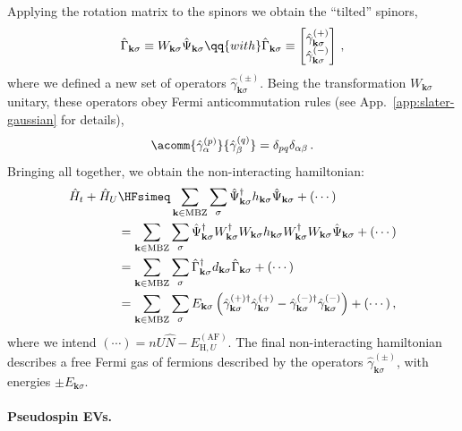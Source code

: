 Applying the rotation matrix to the spinors we obtain the ``tilted'' spinors,
\begin{equation}\label{eq:af-Gamma=WPsi}
	\hat\Gamma_{\mathbf{k}\sigma} \equiv W_{\mathbf{k}\sigma} \hat \Psi_{\mathbf{k}\sigma}
	\qq{with}
	\hat\Gamma_{\mathbf{k}\sigma} \equiv \begin{bmatrix}
		\hat \gamma_{\mathbf{k}\sigma}^{(+)} \\ \hat \gamma_{\mathbf{k}\sigma}^{(-)}
	\end{bmatrix} \, ,
\end{equation}
where we defined a new set of operators $\hat \gamma^{(\pm)}_{\mathbf{k}\sigma}$. Being the transformation $W_{\mathbf{k}\sigma}$ unitary, these operators obey Fermi anticommutation rules (see App.~\ref{app:slater-gaussian} for details),
\[
	\acomm{\hat \gamma_\alpha^{(p)}}{\hat \gamma_\beta^{(q)}} = \delta_{pq} \delta_{\alpha\beta} \, .
\]
Bringing all together, we obtain the non-interacting hamiltonian:
\begin{align}
	\hat H_t + \hat H_U &\HFsimeq \sum_{\mathbf{k} \in \mathrm{MBZ}} \sum_\sigma \hat \Psi_{\mathbf{k}\sigma}^\dagger h_{\mathbf{k}\sigma} \hat \Psi_{\mathbf{k}\sigma} + (\cdots) \nonumber \\
	&= \sum_{\mathbf{k} \in \mathrm{MBZ}} \sum_\sigma \hat \Psi_{\mathbf{k}\sigma}^\dagger W_{\mathbf{k}\sigma}^\dagger W_{\mathbf{k}\sigma} h_{\mathbf{k}\sigma} W_{\mathbf{k}\sigma}^\dagger W_{\mathbf{k}\sigma} \hat \Psi_{\mathbf{k}\sigma} + (\cdots) \nonumber \\
	&= \sum_{\mathbf{k} \in \mathrm{MBZ}} \sum_\sigma \hat \Gamma_{\mathbf{k}\sigma}^\dagger d_{\mathbf{k}\sigma} \hat \Gamma_{\mathbf{k}\sigma} + (\cdots) \nonumber \\
	&= \sum_{\mathbf{k} \in \mathrm{MBZ}} \sum_\sigma E_{\mathbf{k}\sigma} \left(
	\hat \gamma_{\mathbf{k}\sigma}^{(+)\dagger} \hat \gamma_{\mathbf{k}\sigma}^{(+)} - \hat \gamma_{\mathbf{k}\sigma}^{(-)\dagger} \hat \gamma_{\mathbf{k}\sigma}^{(-)}
	\right) + (\cdots) \label{eq:af-hm-bog} \, ,
\end{align}
where we intend $(\cdots) = nU \hat N -  E_{\mathrm{H},U}^{(\mathrm{AF})}$. The final non-interacting hamiltonian describes a free Fermi gas of fermions described by the operators $\hat \gamma^{(\pm)}_{\mathbf{k}\sigma}$, with energies $\pm E_{\mathbf{k}\sigma}$.

\paragraph{Pseudospin EVs.}

